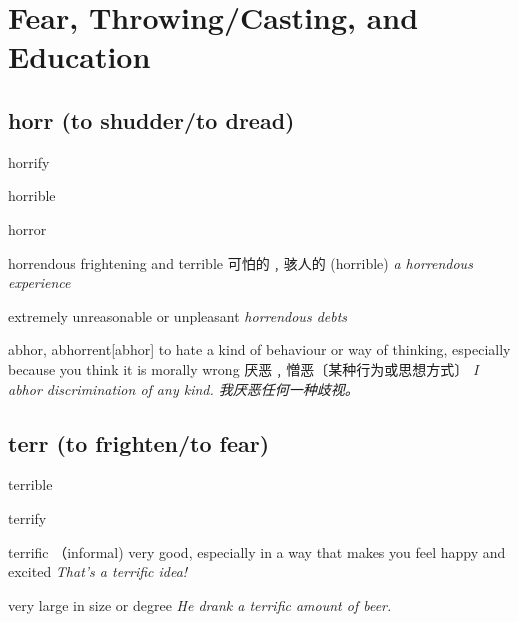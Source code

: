 \chapter{Fear, Throwing/Casting, and Education}

\section{horr (to shudder/to dread)}

\begin{DefWord}{horrify}
\end{DefWord}

\begin{DefWord}{horrible}
\end{DefWord}

\begin{DefWord}{horror}
\end{DefWord}

\begin{DefWord}{horrendous}
    frightening and terrible 可怕的﹐骇人的 (horrible)
    \textit{a horrendous experience}

    extremely unreasonable or unpleasant
    \textit{horrendous debts}
\end{DefWord}

\begin{DefWord}{abhor, abhorrent}[abhor]
    to hate a kind of behaviour or way of thinking, especially because you think it is morally wrong 厌恶﹐憎恶〔某种行为或思想方式〕
 \textit{I abhor discrimination of any kind. 我厌恶任何一种歧视。}
\end{DefWord}







\section{terr (to frighten/to fear)}

\begin{DefWord}{terrible}
\end{DefWord}

\begin{DefWord}{terrify}
\end{DefWord}

\begin{DefWord}{terrific}
    （informal) very good, especially in a way that makes you feel happy and excited
    \textit{That’s a terrific idea!}

    very large in size or degree
    \textit{He drank a terrific amount of beer.}
\end{DefWord}

